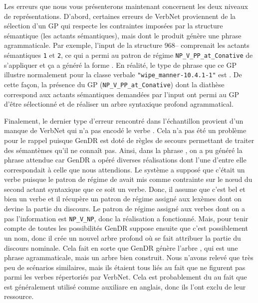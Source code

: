 Les erreurs que nous vous présenterons maintenant concernent les deux niveaux de représentations. D'abord, certaines erreurs de VerbNet proviennent de la sélection d'un \ac{GP} qui respecte les contraintes imposées par la structure sémantique (les actants sémantiques), mais dont le produit génère une phrase agrammaticale. Par exemple, l'input de la structure 968-- comprenait les actants sémantiques \texttt{1} et \texttt{2}, ce qui a permi au patron de régime \texttt{NP\_V\_PP\_at\_Conative} de s'appliquer et ça a généré la forme \ungr{}. En réalité, le type de phrase que ce \ac{GP} illustre normalement pour la classe verbale \texttt{"wipe\_manner-10.4.1-1"} est . De cette façon, la présence du \ac{GP} (\texttt{NP\_V\_PP\_at\_Conative}) dont la diathèse correspond aux actants sémantiques demandées par l'input ont permi au \ac{GP} d'être sélectionné et de réaliser un arbre syntaxique profond agrammatical.

Finalement, le dernier type d'erreur rencontré dans l'échantillon provient d'un manque de VerbNet qui n'a pas encodé le verbe . Cela n'a pas été un problème pour le rappel puisque GenDR est doté de règles de secours permettant de traiter des sémantèmes qu'il ne connaît pas. Ainsi, dans la phrase , on a pu généré la phrase attendue car GenDR a opéré diverses réalisations dont l'une d'entre elle correspondait à celle que nous attendions. Le système a supposé que c'était un verbe puisque le patron de régime de  avait mis comme contrainte sur le n\oe{}ud du second actant syntaxique que ce soit un verbe. Donc, il assume que c'est bel et bien un verbe et il récupère un patron de régime assigné aux lexèmes dont on devine la partie du discours. Le patron de régime assigné aux verbes dont on a pas l'information est \texttt{NP\_V\_NP}, donc la réalisation a fonctionné. Mais, pour tenir compte de toutes les possibilités GenDR suppose ensuite que c'est possiblement un nom, donc il crée un nouvel arbre profond où  se fait attribuer la partie du discours nominale. Cela fait en sorte que GenDR génère l'arbre , qui est une phrase agrammaticale, mais un arbre bien construit. Nous n'avons relevé que très peu de scénarios similaires, mais ils étaient tous liés au fait que  ne figurent pas parmi les verbes répertoriés par VerbNet. Cela est probablement du au fait que  est généralement utilisé comme auxiliare en anglais, donc ils l'ont exclu de leur ressource.

